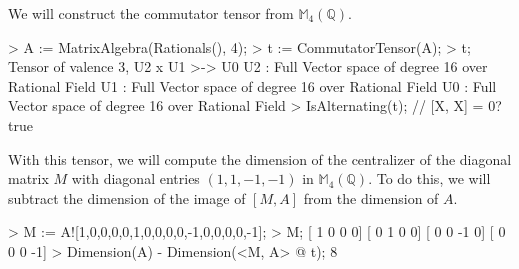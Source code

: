 \begin{example}[CommutatorFromAlgebra]

We will construct the commutator tensor from $\mathbb{M}_4(\mathbb{Q})$. 
\begin{code}
> A := MatrixAlgebra(Rationals(), 4);
> t := CommutatorTensor(A);
> t;
Tensor of valence 3, U2 x U1 >-> U0
U2 : Full Vector space of degree 16 over Rational Field
U1 : Full Vector space of degree 16 over Rational Field
U0 : Full Vector space of degree 16 over Rational Field
> IsAlternating(t); // [X, X] = 0?
true
\end{code}

With this tensor, we will compute the dimension of the centralizer of the diagonal matrix $M$ with diagonal entries $(1,1,-1,-1)$ in $\mathbb{M}_4(\mathbb{Q})$. 
To do this, we will subtract the dimension of the image of $[M, A]$ from the dimension of $A$. 

\begin{code}
> M := A![1,0,0,0,0,1,0,0,0,0,-1,0,0,0,0,-1];
> M;
[ 1  0  0  0]
[ 0  1  0  0]
[ 0  0 -1  0]
[ 0  0  0 -1]
> Dimension(A) - Dimension(<M, A> @ t);
8
\end{code}
\end{example}

